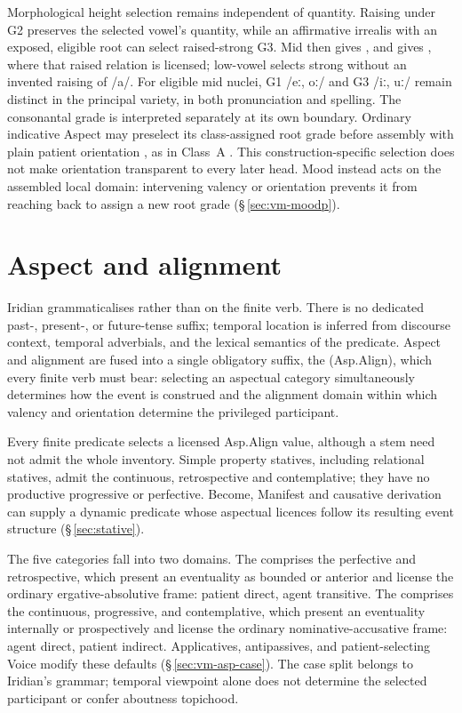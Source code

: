 Morphological height selection remains independent of quantity. Raising under G2
preserves the selected vowel's quantity, while an affirmative irrealis
with an exposed, eligible root can select raised-strong G3. Mid
 then gives , and  gives , where
that raised relation is licensed; low-vowel  selects
strong  without an invented raising of /a/.
For eligible mid nuclei, G1 /eː, oː/ and G3 /iː, uː/ remain distinct
in the principal variety, in both pronunciation and spelling. The consonantal grade is interpreted separately
at its own boundary.
Ordinary indicative Aspect may preselect its class-assigned root grade
before assembly with plain patient orientation , as in
Class~A . This construction-specific selection does not
make orientation transparent to every later head. Mood instead acts on
the assembled local domain: intervening valency or orientation prevents
it from reaching back to assign a new root grade
(§\,\ref{sec:vm-moodp}).


\section{Aspect and alignment}
\label{sec:aspect}

Iridian grammaticalises  rather than  on the finite
verb. There is no dedicated past-, present-, or future-tense suffix; temporal
location is inferred from discourse context, temporal adverbials, and the
lexical semantics of the predicate. Aspect and alignment are fused into a single
obligatory suffix, the  (Asp.Align), which every
finite verb must bear: selecting an aspectual category simultaneously determines
how the event is construed and the alignment domain within which
valency and orientation determine the privileged participant.

Every finite predicate selects a licensed Asp.Align value, although a stem
need not admit the whole inventory. Simple property statives, including
relational statives, admit the continuous, retrospective and contemplative;
they have no productive progressive or perfective. Become, Manifest and
causative derivation can supply a dynamic predicate whose aspectual licences
follow its resulting event structure (§\,\ref{sec:stative}).

The five  categories fall into two domains. The
 comprises the perfective and retrospective, which
present an eventuality as bounded or anterior and license the ordinary
ergative-absolutive frame: patient direct, agent transitive. The
 comprises the continuous, progressive, and
contemplative, which present an eventuality internally or prospectively and
license the ordinary nominative-accusative frame: agent direct, patient
indirect. Applicatives, antipassives, and patient-selecting Voice modify these
defaults (§\,\ref{sec:vm-asp-case}). The case split belongs to Iridian's
grammar; temporal viewpoint alone does not determine the selected participant
or confer aboutness topichood.

